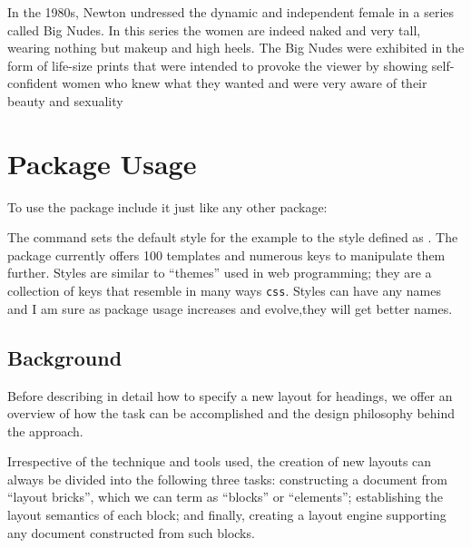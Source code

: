 In the 1980s, Newton undressed the dynamic and independent
female in a series called Big Nudes. In this series the women are
indeed naked and very tall, wearing nothing but makeup and high
heels. The Big Nudes were exhibited in the form of life-size prints
that were intended to provoke the viewer by showing self-confident
women who knew what they wanted and were very aware of their
beauty and sexuality



\chapter{Package Usage}

To use the package include it just like any other package:


The command  sets the default style for the example to the style defined as . The package currently offers  100 templates and numerous keys to manipulate them further. Styles are similar to \enquote{themes} used in web programming; they are a collection of keys that resemble in many ways \texttt{css}. Styles can have any names and I am sure as package usage increases and evolve,they will get better names. 

\section{Background}

Before describing in detail how to specify a new layout for headings, we offer an overview of how the task can be accomplished and the design philosophy behind the approach. 

Irrespective of the technique and tools used, the creation of new layouts can always be divided into the following three tasks: constructing a document from “layout bricks”, which we can term as “blocks” or “elements”; establishing the layout semantics of each block; and finally, creating a layout engine supporting any document constructed from such blocks.

